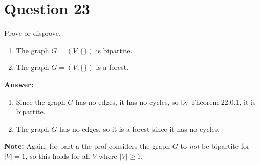 \documentclass[openany]{report}
\begin{document}
\section{Question 23}
Prove or disprove. 
\begin{enumerate}[label=(\alph*)]
    \item The graph $G = (V, \{\})$ is bipartite.
    \item The graph $G = (V, \{\})$ is a forest.
\end{enumerate} 
\textbf{Answer:}
\begin{enumerate}[label=(\alph*)]
    \item Since the graph $G$ has no edges, it has no cycles, so by Theorem 22.0.1, it is bipartite.
    \item The graph $G$ has no edges, so it is a forest since it has no cycles.
\end{enumerate}
\begin{center}
    \textbf{Note:} Again, for part a the prof considers the graph $G$ to \emph{not} be bipartite for $|V| = 1$, so this holds for all $V$ where $|V| \geq 1$.  
\end{center}
\end{document}
